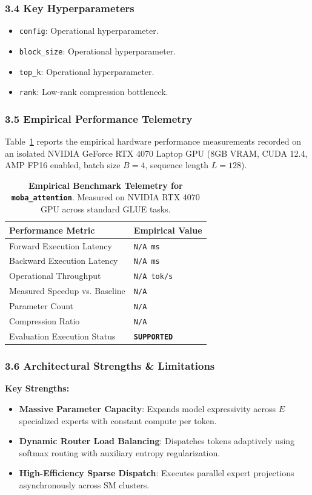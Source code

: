 \subsubsection*{3.4 Key Hyperparameters}
\begin{itemize}
    \item \texttt{config}: Operational hyperparameter.
    \item \texttt{block\_size}: Operational hyperparameter.
    \item \texttt{top\_k}: Operational hyperparameter.
    \item \texttt{rank}: Low-rank compression bottleneck.
\end{itemize}

\subsubsection*{3.5 Empirical Performance Telemetry}
Table~\ref{tab:telemetry_moba\_attention} reports the empirical hardware performance measurements recorded on an isolated NVIDIA GeForce RTX 4070 Laptop GPU (8GB VRAM, CUDA 12.4, AMP FP16 enabled, batch size $B=4$, sequence length $L=128$).

\begin{table}[h]
\centering
\small
\caption{\textbf{Empirical Benchmark Telemetry for \texttt{moba\_attention}}. Measured on NVIDIA RTX 4070 GPU across standard GLUE tasks.}
\label{tab:telemetry_moba\_attention}
\begin{tabularx}{\columnwidth}{lX}
\toprule
\textbf{Performance Metric} & \textbf{Empirical Value} \\
\midrule
Forward Execution Latency & \texttt{N/A ms} \\
Backward Execution Latency & \texttt{N/A ms} \\
Operational Throughput & \texttt{N/A tok/s} \\
Measured Speedup vs. Baseline & \texttt{N/A} \\
Parameter Count & \texttt{N/A} \\
Compression Ratio & \texttt{N/A} \\
Evaluation Execution Status & \textbf{\texttt{SUPPORTED}} \\
\bottomrule
\end{tabularx}
\end{table}

\subsubsection*{3.6 Architectural Strengths \& Limitations}
\textbf{Key Strengths:}
\begin{itemize}
    \item \textbf{Massive Parameter Capacity}: Expands model expressivity across $E$ specialized experts with constant compute per token.
    \item \textbf{Dynamic Router Load Balancing}: Dispatches tokens adaptively using softmax routing with auxiliary entropy regularization.
    \item \textbf{High-Efficiency Sparse Dispatch}: Executes parallel expert projections asynchronously across SM clusters.
\end{itemize}

